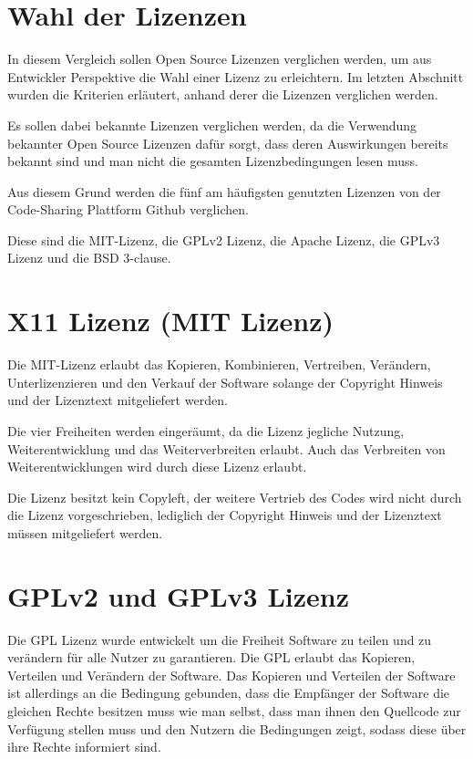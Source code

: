 \section{Wahl der Lizenzen}
In diesem Vergleich sollen Open Source Lizenzen verglichen werden, um aus Entwickler Perspektive die Wahl einer Lizenz zu erleichtern. Im letzten Abschnitt wurden die Kriterien erl\"autert, anhand derer die Lizenzen verglichen werden. 

Es sollen dabei bekannte Lizenzen verglichen werden, da die Verwendung bekannter Open Source Lizenzen daf\"ur sorgt, dass deren Auswirkungen bereits bekannt sind und man nicht die gesamten Lizenzbedingungen lesen muss. 

Aus diesem Grund werden die f\"unf am h\"aufigsten genutzten Lizenzen von der Code-Sharing Plattform Github verglichen. 

Diese sind die MIT-Lizenz, die GPLv2 Lizenz, die Apache Lizenz, die GPLv3 Lizenz und die BSD 3-clause. 

\section{X11 Lizenz (MIT Lizenz)}

Die MIT-Lizenz erlaubt das Kopieren, Kombinieren, Vertreiben, Ver\"andern, Unterlizenzieren und den Verkauf der Software solange der Copyright Hinweis und der Lizenztext mitgeliefert werden. 

Die vier Freiheiten werden einger\"aumt, da die Lizenz jegliche Nutzung, Weiterentwicklung und das Weiterverbreiten erlaubt. Auch das Verbreiten von Weiterentwicklungen wird durch diese Lizenz erlaubt. 

Die Lizenz besitzt kein Copyleft, der weitere Vertrieb des Codes wird nicht durch die Lizenz vorgeschrieben, lediglich der Copyright Hinweis und der Lizenztext m\"ussen mitgeliefert werden. 

\section{GPLv2 und GPLv3 Lizenz}

Die GPL Lizenz wurde entwickelt um die Freiheit Software zu teilen und zu ver\"andern f\"ur alle Nutzer zu garantieren. Die GPL erlaubt das Kopieren, Verteilen und Ver\"andern der Software. Das Kopieren und Verteilen der Software ist allerdings an die Bedingung gebunden, dass die Empf\"anger der Software die gleichen Rechte besitzen muss wie man selbst, dass man ihnen den Quellcode zur Verf\"ugung stellen muss und den Nutzern die Bedingungen zeigt, sodass diese \"uber ihre Rechte informiert sind.  

